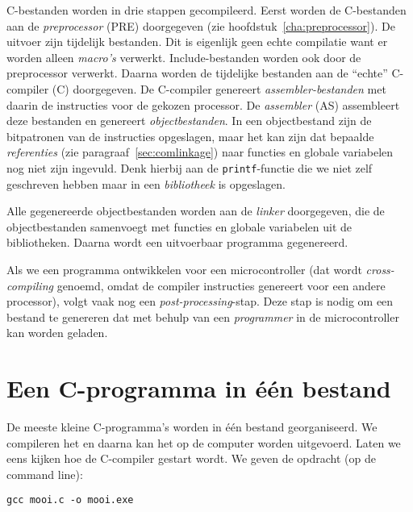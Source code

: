 C-bestanden worden in drie stappen gecompileerd. Eerst worden de C-bestanden aan de \textsl{preprocessor} (PRE) doorgegeven (zie hoofdstuk~\ref{cha:preprocessor}). De uitvoer zijn tijdelijk bestanden. Dit is eigenlijk geen echte compilatie want er worden alleen \textsl{macro's} verwerkt. Include-bestanden worden ook door de preprocessor verwerkt. Daarna worden de tijdelijke bestanden aan de ``echte'' C-compiler (C) doorgegeven. De C-compiler genereert \textsl{assembler-bestanden} met daarin de instructies voor de gekozen processor. De \textsl{assembler} (AS) assembleert deze bestanden en genereert \textsl{objectbestanden}. In een objectbestand zijn de bitpatronen van de instructies opgeslagen, maar het kan zijn dat bepaalde \textsl{referenties} (zie paragraaf~\ref{sec:comlinkage}) naar functies en globale variabelen nog niet zijn ingevuld. Denk hierbij aan de \texttt{printf}-functie die we niet zelf geschreven hebben maar in een \textsl{bibliotheek} is opgeslagen. %

Alle gegenereerde objectbestanden worden aan de \textsl{linker} doorgegeven, die de objectbestanden samenvoegt met functies en globale variabelen uit de bibliotheken. Daarna wordt een uitvoerbaar programma gegenereerd.

Als we een programma ontwikkelen voor een microcontroller (dat wordt \textsl{cross-compiling} genoemd, omdat de compiler instructies genereert voor een andere processor), volgt vaak nog een \textsl{post-processing}-stap. Deze stap is nodig om een bestand te genereren dat met behulp van een \textsl{programmer} in de microcontroller kan worden geladen.


\section{Een C-programma in één bestand}
De meeste kleine C-programma's worden in één bestand georganiseerd. We compileren het en daarna kan het op de computer worden uitgevoerd. Laten we eens kijken hoe de C-compiler gestart wordt. We geven de opdracht (op de command line):

\begin{lstlisting}[style=lstoneline]
gcc mooi.c -o mooi.exe
\end{lstlisting}

